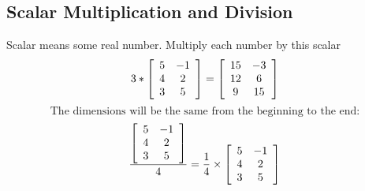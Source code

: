 \documentclass{article}
\begin{document}
\subsection{Scalar Multiplication and Division}
Scalar means some real number. Multiply each number by this scalar
\[
3
*
\left[\begin{array}[]{cc}
    5 & -1 \\
    4 & 2 \\
    3 & 5 \\
\end{array}\right]
=
\left[\begin{array}[]{cc}
    15 & -3 \\
    12 & 6 \\
    9 & 15 \\
\end{array}\right]
\]
\[
\text{The dimensions will be the same from the beginning to the end:}
\]
\[
\frac{
\left[\begin{array}[]{cc}
    5 & -1 \\
    4 & 2 \\
    3 & 5 \\
\end{array}\right]
}{4}
=
\frac{1}{4}
\times 
\left[\begin{array}[]{cc}
    5 & -1 \\
    4 & 2 \\
    3 & 5 \\
\end{array}\right]
\]
\end{document}
